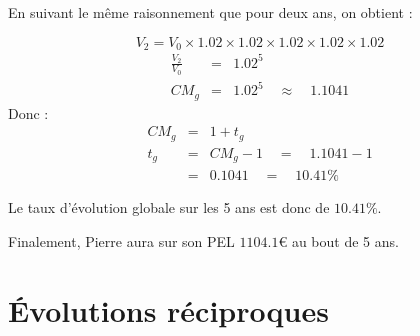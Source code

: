 \begin{ex}{}{}
En suivant le même raisonnement que pour deux ans, on obtient :

\[V_{2} = V_{0}\times 1.02\times 1.02\times 1.02\times 1.02\times 1.02\]
\begin{eqnarray*}
\frac{V_{2}}{V_{0}} &=& 1.02^{5}\\
CM_{g} &=& 1.02^{5} \quad \approx \quad 1.1041
\end{eqnarray*}
Donc :
\begin{eqnarray*}
CM_{g} &=& 1 + t_{g}\\
t_{g} &=& CM_{g} - 1 \quad = \quad 1.1041 - 1\\
&=& 0.1041 \quad = \quad 10.41 \%
\end{eqnarray*}

Le taux d'évolution globale sur les 5 ans est donc de $10.41\%$.

Finalement, Pierre aura sur son PEL $1104.1$€ au bout de 5 ans.
\end{ex}

\section{Évolutions réciproques}

